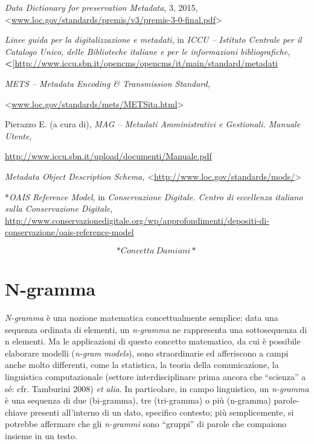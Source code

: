 \documentclass[
  b5paper,
  twoside,
  12pt,
  chapterprefix=false,
  bibliography=totocnumbered,
  parskip=false]{scrbook}
\begin{document}
\emph{Data Dictionary for preservation Metadata}, 3, 2015,
\textless{}{\href{http://www.loc.gov/standards/premis/v3/premis-3-0-final.pdf}{www.loc.gov/standards/premis/v3/premis-3-0-final.pdf}\textgreater{}}

\emph{Linee guida per la digitalizzazione e metadati}, in \emph{ICCU -- Istituto
Centrale per il Catalogo Unico, delle Biblioteche italiane e per le
informazioni bibliografiche},
\textbf{\textless{}}{[}\url{http://www.iccu.sbn.it/opencms/opencms/it/main/standard/metadati}

\emph{METS -- Metadata Encoding \& Transmission Standard},

\textless{}\href{http://www.loc.gov/standards/mets/METSita.html}{{www.loc.gov/standards/mets/METSita.html}}\textgreater{}

Pierazzo E. (a cura di), \emph{MAG -- Metadati Amministrativi e Gestionali.
Manuale Utente},

\url{http://www.iccu.sbn.it/upload/documenti/Manuale.pdf}

\emph{Metadata Object Description Schema,}
\textless{}\href{http://www.loc.gov/standards/mods/}{{http://www.loc.gov/standards/mods/}}\textgreater{}

*\emph{OAIS Reference Model}, in \emph{Conservazione Digitale. Centro di
eccellenza italiano sulla Conservazione Digitale},
\url{http://www.conservazionedigitale.org/wp/approfondimenti/depositi-di-conservazione/oais-reference-model}

\[*Concetta~Damiani*\]

\hypertarget{n-gramma}{%
\chapter{N-gramma}\label{n-gramma}}

\emph{N-gramma} è una nozione matematica concettualmente semplice: data una
sequenza ordinata di elementi, un \emph{n-gramma} ne rappresenta una
sottosequenza di n elementi. Ma le applicazioni di questo concetto
matematico, da cui è possibile elaborare modelli (\emph{n-gram models}), sono
straordinarie ed afferiscono a campi anche molto differenti, come la
statistica, la teoria della comunicazione, la linguistica computazionale
(settore interdisciplinare prima ancora che \enquote{scienza} a sé: cfr.
Tamburini 2008) \emph{et alia}. In particolare, in campo linguistico, un
\emph{n-gramma} è una sequenza di due (bi-gramma), tre (tri-gramma) o più
(n-gramma) parole-chiave presenti all'interno di un dato, specifico
contesto; più semplicemente, si potrebbe affermare che gli \emph{n-grammi}
sono \enquote{gruppi} di parole che compaiono insieme in un testo.
\end{document}
